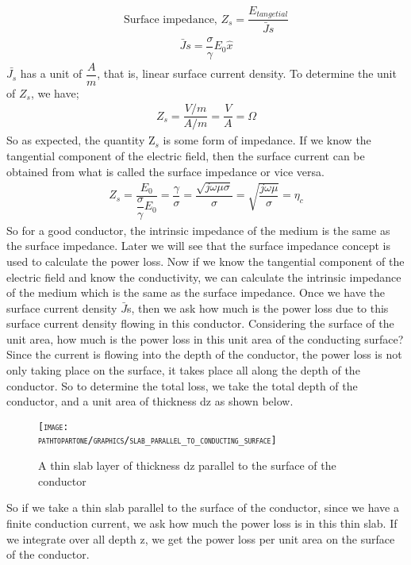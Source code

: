 \begin{align}
\text{Surface impedance, }Z_{s}=\dfrac{E_{tangetial}}{\bar{J}s}
\end{align}
\begin{align}
\bar{J}s=\dfrac{\sigma}{\gamma}E_0\hat{x}
\end{align}
$\bar{J_{s}}$ has a unit of $\dfrac{A}{m}$, that is, linear surface current density.
To determine the unit of $Z_{s}$, we have;
\begin{align}
Z_{s}=\dfrac{V/m}{A/m}=\dfrac{V}{A}=\Omega
\end{align}
So as expected, the quantity Z$_{s}$ is some form of impedance. If we know the tangential component of the electric field, then the surface current can be obtained from what is called the surface impedance or vice versa.
\begin{align}
Z_{s}=\dfrac{E_0}{\dfrac{\sigma}{\gamma} E_0}=\dfrac{\gamma}{\sigma}=\dfrac{\sqrt{j\omega\mu\sigma}}{\sigma}=\sqrt{\dfrac{j\omega\mu}{\sigma}}=\eta_{c}
\end{align}
So for a good conductor, the intrinsic impedance of the medium is the same as the surface impedance. Later we will see that the surface impedance concept is used to calculate the power loss. Now if we know the tangential component of the electric field and know the conductivity, we can calculate the intrinsic impedance of the medium which is the same as the surface impedance.
Once we have the surface current density $\bar{J}$s, then we ask how much is the power loss due to this surface current density flowing in this conductor. Considering the surface of the unit area, how much is the power loss in this unit area of the conducting surface? Since the current is flowing into the depth of the conductor, the power loss is not only taking place on the surface, it takes place all along the depth of the conductor. So to determine the total loss, we take the total depth of the conductor, and a unit area of thickness dz as shown below.

\begin{figure}
\centering
\textsc{\texttt{[image: \\pathtopartone/graphics/slab\_parallel\_to\_conducting\_surface]}}
\caption{A thin slab layer of thickness dz parallel to the surface of the conductor }
\end{figure}
So if we take a thin slab parallel to the surface of the conductor, since we have a finite conduction current, we ask how much the power loss is in this thin slab. If we integrate over all depth z, we get the power loss per unit area on the surface of the conductor.

